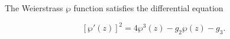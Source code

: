The Weierstrass $\wp$ function satisfies the differential equation

$$[\wp'(z)]^2 = 4\wp^3(z) - g_2\wp(z) - g_3.$$
